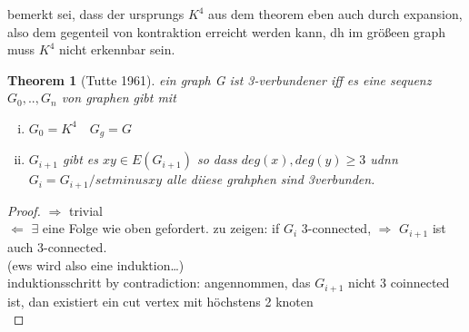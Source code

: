 \documentclass[a4paper]{article}
\newtheorem{theorem}{Theorem}[section]
\theoremstyle{definition}
\theoremstyle{remark}
\begin{document}
bemerkt sei, dass der ursprungs $K^4$ aus dem theorem eben auch durch expansion, also dem gegenteil von kontraktion erreicht werden kann, dh im größeen graph muss $K^4$ nicht erkennbar sein.
\begin{theorem}
  [Tutte 1961]
ein graph G ist  3-verbundener iff es eine sequenz $G_0,..,G_n$ von graphen gibt mit 
\begin{enumerate}[(i)]
  \item $G_0=K^4 \quad G_g=G$
  \item $G_{i+1}$ gibt es $xy\in E(G_{i+1})$ so dass $deg(x), deg(y)\geq 3$ udnn $G_i=G_{i+1}/setminus xy$
    alle diiese grahphen sind 3verbunden.
\end{enumerate}
\end{theorem}
\begin{proof}
  $\Rightarrow$ trivial\\
  $\Leftarrow$ $\exists$ eine Folge wie oben gefordert. zu zeigen: if $G_i$ 3-connected, $\Rightarrow$ $G_{i+1}$ ist auch 3-connected.\\
  (ews wird also eine induktion\dots)\\
  induktionsschritt by contradiction: angennommen, das $G_{i+1}$ nicht 3 coinnected ist, dan existiert ein cut vertex mit höchstens 2 knoten\\
\end{proof}
\end{document}
